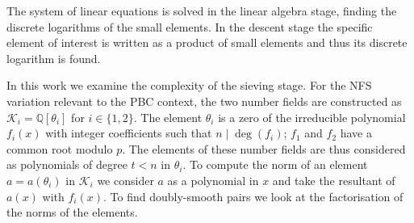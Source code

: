 \documentclass[a4paper, 12pt, envcountsect, runningheads]{llncs}
\newcommand{\Q}{\mathbb{Q}}
\numberwithin{figure}{section}
\numberwithin{equation}{section}
\begin{document}
The system of linear equations is solved in the linear algebra stage, finding the discrete logarithms of the small elements. In the descent stage the specific element of interest is written as a product of small elements and thus its discrete logarithm is found. 

In this work we examine the complexity of the sieving stage. For the NFS variation relevant to the PBC context, the two number fields are constructed as $\mathcal{K}_{i}=\Q[\theta_i]$ for $i\in\{1,2\}$. The element $\theta_i$ is a zero of the irreducible polynomial $f_i(x)$ with integer coefficients such that $n\mid\deg(f_i)$; $f_1$ and $f_2$ have a common root modulo $p$. The elements of these number fields are thus considered as polynomials of degree $t<n$ in $\theta_i$. To compute the norm of an element $a=a(\theta_i)$ in $\mathcal{K}_i$ we consider $a$ as a polynomial in $x$ and take the resultant of $a(x)$ with $f_i(x).$ To find doubly-smooth pairs we look at the factorisation of the norms of the elements.
\end{document}
